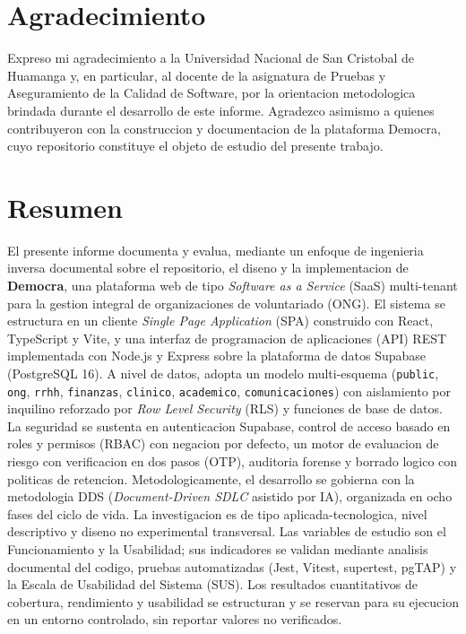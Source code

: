 \documentclass[11pt,a4paper,oneside]{report}
\begin{document}
\chapter*{Agradecimiento}
Expreso mi agradecimiento a la Universidad Nacional de San Cristobal de Huamanga y, en particular,
al docente de la asignatura de Pruebas y Aseguramiento de la Calidad de Software, por la orientacion
metodologica brindada durante el desarrollo de este informe. Agradezco asimismo a quienes
contribuyeron con la construccion y documentacion de la plataforma Democra, cuyo repositorio
constituye el objeto de estudio del presente trabajo.

\chapter*{Resumen}
El presente informe documenta y evalua, mediante un enfoque de ingenieria inversa documental sobre
el repositorio, el diseno y la implementacion de \textbf{Democra}, una plataforma web de tipo
\textit{Software as a Service} (SaaS) multi-tenant para la gestion integral de organizaciones de
voluntariado (ONG). El sistema se estructura en un cliente \textit{Single Page Application} (SPA)
construido con React, TypeScript y Vite, y una interfaz de programacion de aplicaciones (API) REST
implementada con Node.js y Express sobre la plataforma de datos Supabase (PostgreSQL 16). A nivel de
datos, adopta un modelo multi-esquema (\texttt{public}, \texttt{ong}, \texttt{rrhh},
\texttt{finanzas}, \texttt{clinico}, \texttt{academico}, \texttt{comunicaciones}) con aislamiento
por inquilino reforzado por \textit{Row Level Security} (RLS) y funciones de base de datos. La
seguridad se sustenta en autenticacion Supabase, control de acceso basado en roles y permisos (RBAC)
con negacion por defecto, un motor de evaluacion de riesgo con verificacion en dos pasos (OTP),
auditoria forense y borrado logico con politicas de retencion. Metodologicamente, el desarrollo se
gobierna con la metodologia DDS (\textit{Document-Driven SDLC} asistido por IA), organizada en
ocho fases del ciclo de vida. La investigacion es de tipo aplicada-tecnologica, nivel descriptivo y
diseno no experimental transversal. Las variables de estudio son el Funcionamiento y la Usabilidad;
sus indicadores se validan mediante analisis documental del codigo, pruebas automatizadas (Jest,
Vitest, supertest, pgTAP) y la Escala de Usabilidad del Sistema (SUS). Los resultados cuantitativos
de cobertura, rendimiento y usabilidad se estructuran y se reservan para su ejecucion en un entorno
controlado, sin reportar valores no verificados.
\end{document}
